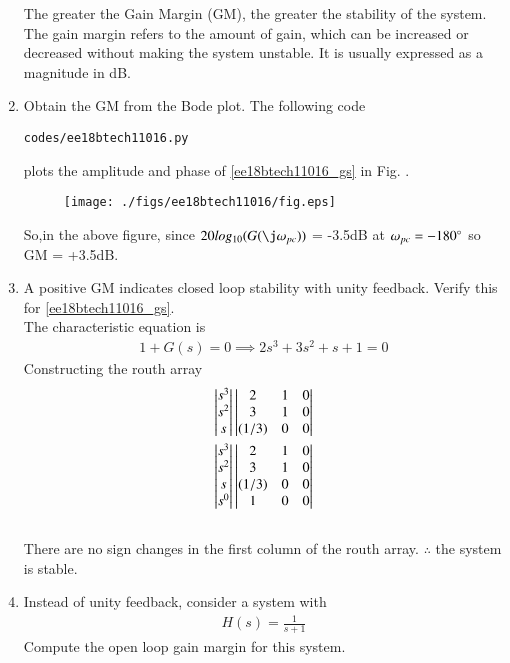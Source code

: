 \begin{enumerate}[label=\thesection.\arabic*.,ref=\thesection.\theenumi]
The greater the Gain Margin (GM), the greater the stability of the system. The gain margin refers to the amount of gain, which can be increased or decreased without making the system unstable. It is usually expressed as a magnitude in dB.
\item Obtain the GM from the Bode plot.
\solution The following code 
\begin{lstlisting}
codes/ee18btech11016.py
\end{lstlisting}
%
plots the amplitude and phase of \eqref{ee18btech11016_gs} in Fig. \label{fig:ee18btech11016}.
%
\begin{figure}[htp]
	\centering
	\texttt{[image: ./figs/ee18btech11016/fig.eps]}
	\caption{}
	\label{fig:ee18btech11016}
\end{figure}
So,in the above figure, since $20log_{10}(G(\j\omega_{pc}))$ = -3.5dB at $\omega_{pc} = -180\degree$ so GM = +3.5dB. 
\item A positive GM indicates closed loop stability with unity feedback.  Verify this for \eqref{ee18btech11016_gs}.
\\
\solution 
The characteristic equation is 
\begin{align}
1+G(s)=0 
\implies 2s^3 + 3s^2 + s + 1 = 0 
\end{align}
Constructing the routh array
\begin{align}
\begin{vmatrix}s^3\\s^2\\s\end{vmatrix}
\begin{vmatrix}2 & 1 & 0 \\ 3 & 1 & 0 \\ (1/3) & 0 & 0\end{vmatrix}
\\
\begin{vmatrix}s^3\\s^2\\s\\s^0\end{vmatrix}
\begin{vmatrix}2 & 1 & 0 \\ 3 & 1 & 0 \\ (1/3) & 0 & 0 \\ 1 & 0 & 0\end{vmatrix}
\end{align}\\
%
There are no sign changes in the first column of the routh array. 
$\therefore$ the system is stable.
\\

\item Instead of unity feedback, consider a system with 
%
\begin{align}
H(s)=\frac{1}{s+1}
\end{align}
%
Compute the open loop gain margin for this system.
\\
\solution 


\end{enumerate}
